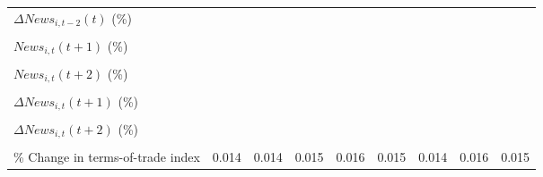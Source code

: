 {\begin{tabular}{l*{8}{c}}
\addlinespace
$ \Delta News_{i,t-2}(t)$ (\%)&                     &                     &                     &                     &                     &                     &                     &                     \\
                    &                     &                     &                     &                     &                     &                     &                     &                     \\
\addlinespace
$ News_{i,t}(t+1)$ (\%)&                     &                     &                     &                     &                     &                     &                     &                     \\
                    &                     &                     &                     &                     &                     &                     &                     &                     \\
\addlinespace
$ News_{i,t}(t+2)$ (\%)&                     &                     &                     &                     &                     &                     &                     &                     \\
                    &                     &                     &                     &                     &                     &                     &                     &                     \\
\addlinespace
$ \Delta News_{i,t}(t+1)$ (\%)&                     &                     &                     &                     &                     &                     &                     &                     \\
                    &                     &                     &                     &                     &                     &                     &                     &                     \\
\addlinespace
$ \Delta News_{i,t}(t+2)$ (\%)&                     &                     &                     &                     &                     &                     &                     &                     \\
                    &                     &                     &                     &                     &                     &                     &                     &                     \\
\addlinespace
\% Change in terms-of-trade index&       0.014         &       0.014         &       0.015         &       0.016         &       0.015         &       0.014         &       0.016         &       0.015         \\

\end{tabular}}
